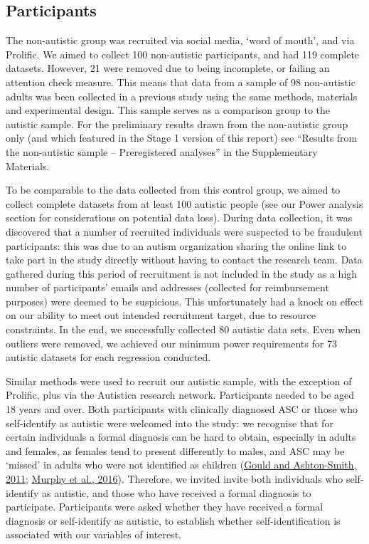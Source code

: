 \documentclass[
]{article}
\begin{document}
\hypertarget{participants}{%
\subsection*{Participants}\label{participants}}

The non-autistic group was recruited via social media, `word of mouth', and via Prolific. We aimed to collect 100 non-autistic participants, and had 119 complete datasets. However, 21 were removed due to being incomplete, or failing an attention check measure. This means that data from a sample of 98 non-autistic adults was been collected in a previous study using the same methods, materials and experimental design. This sample serves as a comparison group to the autistic sample. For the preliminary results drawn from the non-autistic group only (and which featured in the Stage 1 version of this report) see ``Results from the non-autistic sample -- Preregistered analyses'' in the Supplementary Materials.

To be comparable to the data collected from this control group, we aimed to collect complete datasets from at least 100 autistic people (see our Power analysis section for considerations on potential data loss). During data collection, it was discovered that a number of recruited individuals were suspected to be fraudulent participants: this was due to an autism organization sharing the online link to take part in the study directly without having to contact the research team. Data gathered during this period of recruitment is not included in the study as a high number of participants' emails and addresses (collected for reimbursement purposes) were deemed to be suspicious. This unfortunately had a knock on effect on our ability to meet out intended recruitment target, due to resource constraints. In the end, we successfully collected 80 autistic data sets. Even when outliers were removed, we achieved our minimum power requirements for 73 autistic datasets for each regression conducted.

Similar methods were used to recruit our autistic sample, with the exception of Prolific, plus via the Autistica research network. Participants needed to be aged 18 years and over. Both participants with clinically diagnosed ASC or those who self-identify as autistic were welcomed into the study: we recognise that for certain individuals a formal diagnosis can be hard to obtain, especially in adults and females, as females tend to present differently to males, and ASC may be `missed' in adults who were not identified as children (\protect\hyperlink{ref-gould2011a}{Gould and Ashton-Smith, 2011}; \protect\hyperlink{ref-murphy2016a}{Murphy et al., 2016}). Therefore, we invited invite both individuals who self-identify as autistic, and those who have received a formal diagnosis to participate. Participants were asked whether they have received a formal diagnosis or self-identify as autistic, to establish whether self-identification is associated with our variables of interest.
\end{document}
